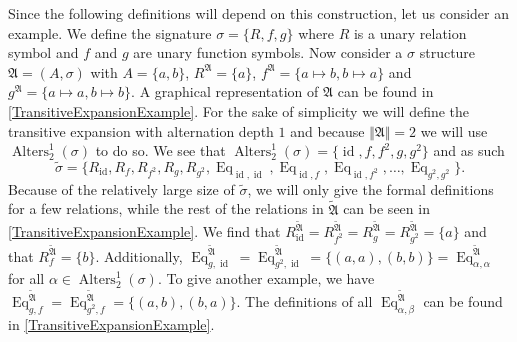 Since the following definitions will depend on this construction, let us consider an example.
We define the signature $\sigma=\{R,f,g\}$ where $R$ is a unary relation symbol and $f$ and $g$ are unary function symbols.
Now consider a $\sigma$ structure $\mathfrak A=(A,\sigma)$ with $A=\{a,b\}$, $R^{\mathfrak A}=\{a\}$, $f^{\mathfrak A}=\{a\mapsto b, b\mapsto a\}$ and $g^{\mathfrak A}=\{a\mapsto a, b\mapsto b\}$.
A graphical representation of $\mathfrak A$ can be found in \cref{TransitiveExpansionExample}.
For the sake of simplicity we will define the transitive expansion with alternation depth $1$ and because $\Vert\mathfrak A\Vert=2$ we will use $\operatorname{Alters}^1_2(\sigma)$ to do so.
We see that $\operatorname{Alters}^1_2(\sigma)=\{\operatorname{id}, f,f^2,g,g^2\}$ and as such 
$$\widetilde{\sigma}=\{R_{\operatorname{id}}, R_{f}, R_{f^2}, R_g, R_{g^2}, \operatorname{Eq}_{\operatorname{id},\operatorname{id}}, \operatorname{Eq}_{\operatorname{id},f}, \operatorname{Eq}_{\operatorname{id}, f^2}, \dots, \operatorname{Eq}_{g^2, g^2}\}.$$
Because of the relatively large size of $\widetilde{\sigma}$, we will only give the formal definitions for a few relations, while the rest of the relations in $\widetilde{\mathfrak A}$ can be seen in \cref{TransitiveExpansionExample}.
We find that $R^{\widetilde{\mathfrak A}}_{\operatorname{id}}=R^{\widetilde{\mathfrak A}}_{f^2}=R^{\widetilde{\mathfrak A}}_g=R^{\widetilde{\mathfrak A}}_{g^2}=\{a\}$ and that $R^{\widetilde{\mathfrak A}}_f=\{b\}$.
Additionally, $\operatorname{Eq}^{\widetilde{\mathfrak A}}_{g,\operatorname{id}}=\operatorname{Eq}^{\widetilde{\mathfrak A}}_{g^2,\operatorname{id}}=\{(a,a),(b,b)\}=\operatorname{Eq}^{\widetilde{\mathfrak A}}_{\alpha,\alpha}$ for all $\alpha\in\operatorname{Alters}^1_2(\sigma)$.
To give another example, we have $\operatorname{Eq}^{\widetilde{\mathfrak A}}_{g,f}=\operatorname{Eq}^{\widetilde{\mathfrak A}}_{g^2,f}=\{(a,b),(b,a)\}$.
The definitions of all $\operatorname{Eq}^{\widetilde{\mathfrak A}}_{\alpha,\beta}$ can be found in \cref{TransitiveExpansionExample}.

